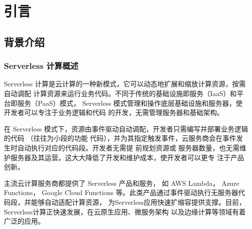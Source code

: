 \documentclass[a4paper,AutoFakeBold,oneside,12pt]{book}
\begin{document}
\blankmatter
  

\blankmatter
  

\blankmatter
  

\blankmatter
 

\frontmatter\tableofcontents %


\newpage\mainmatter
{}


\chapter{引言}

\section{背景介绍}
\subsection{Serverless 计算概述}

Serverless 计算是云计算的一种新模式，它可以动态地扩展和缩放计算资源，按需自动调配
计算资源来运行业务代码。不同于传统的基础设施即服务（IaaS）和平台即服务（PaaS）模式，
Serverless 模式管理和操作底层基础设施和服务器，使开发者可以专注于业务逻辑和代码
的开发，无需管理服务器和基础架构。

在 Serverless 模式下，资源由事件驱动自动调配，开发者只需编写并部署业务逻辑的代码
（往往为小段的功能
代码），并为其指定触发事件，云服务商会在事件发生时自动执行对应的代码段。开发者无需提
前规划资源或
服务器数量，也无需维护服务器及其运营。这大大降低了开发和维护成本，使开发者可以更专
注于产品创新。

主流云计算服务商都提供了 Serverless 产品和服务， 如 AWS Lambda， Azure Functions， 
Google Cloud Functions 等。此类产品通过事件驱动执行无服务器代码段，并能够自动适配计算资源，
为Serverless应用快速扩缩容提供支撑。目前，Serverless计算正快速发展，在云原生应用、微服务架构
以及边缘计算等领域有着广泛的应用。
\end{document}
